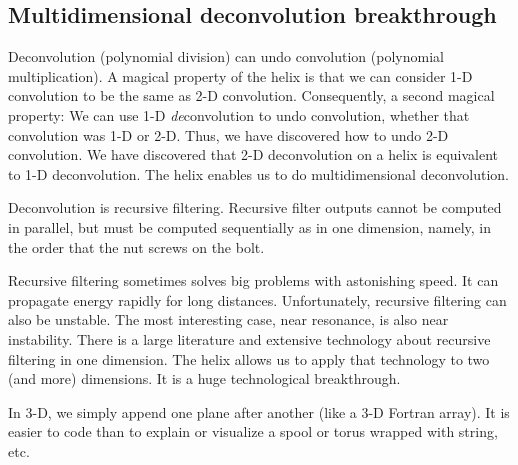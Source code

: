 \subsection{Multidimensional deconvolution breakthrough}
Deconvolution (polynomial division)
can undo convolution (polynomial multiplication).
A magical property of the helix is that we can consider
1-D convolution to be the same as 2-D convolution.
Consequently, a second magical property:
We can use 1-D
 {\em  de}convolution to undo convolution,
whether that convolution was 1-D or 2-D.
Thus, we have discovered how to undo 2-D convolution.
We have discovered that 2-D deconvolution on a helix
is equivalent to        1-D deconvolution.
The helix enables us to do multidimensional deconvolution.
\par
Deconvolution is recursive filtering.
Recursive filter outputs cannot be computed in parallel,
but must be computed sequentially
as in one dimension, namely,
in the order that the nut
screws on the bolt.  
\par
Recursive filtering sometimes solves big problems with astonishing speed.
It can propagate energy rapidly for long distances.
Unfortunately, recursive filtering can also be unstable.
The most interesting case, near resonance, is also near instability.
There is a large literature and extensive technology
about recursive filtering in one dimension.
The helix allows us to apply that technology to two (and more) dimensions.
It is a huge technological breakthrough.
\par
In 3-D, we simply append one plane after
another (like a 3-D Fortran array).
It is easier to code than to explain or visualize
a spool or torus wrapped with string, etc.



